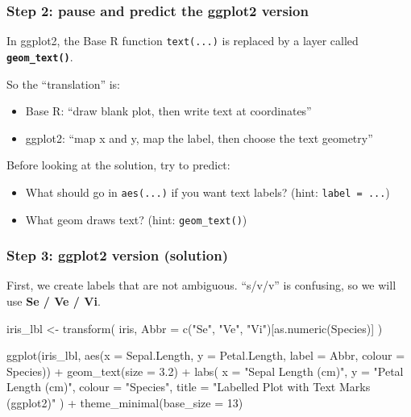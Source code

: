 \documentclass[
  letterpaper,
  DIV=11,
  numbers=noendperiod]{scrartcl}
\newenvironment{Shaded}{\begin{snugshade}}{\end{snugshade}}
\newcommand{\AttributeTok}[1]{\textcolor[rgb]{0.40,0.45,0.13}{#1}}
\newcommand{\DecValTok}[1]{\textcolor[rgb]{0.68,0.00,0.00}{#1}}
\newcommand{\FloatTok}[1]{\textcolor[rgb]{0.68,0.00,0.00}{#1}}
\newcommand{\FunctionTok}[1]{\textcolor[rgb]{0.28,0.35,0.67}{#1}}
\newcommand{\NormalTok}[1]{\textcolor[rgb]{0.00,0.23,0.31}{#1}}
\newcommand{\OtherTok}[1]{\textcolor[rgb]{0.00,0.23,0.31}{#1}}
\newcommand{\SpecialCharTok}[1]{\textcolor[rgb]{0.37,0.37,0.37}{#1}}
\newcommand{\StringTok}[1]{\textcolor[rgb]{0.13,0.47,0.30}{#1}}
\providecommand{\tightlist}{%
  \setlength{\itemsep}{0pt}\setlength{\parskip}{0pt}}\usepackage{longtable,booktabs,array}
\begin{document}
\subsubsection{Step 2: pause and predict the ggplot2
version}\label{step-2-pause-and-predict-the-ggplot2-version-2}

In ggplot2, the Base R function \texttt{text(...)} is replaced by a
layer called \textbf{\texttt{geom\_text()}}.

So the ``translation'' is:

\begin{itemize}
\tightlist
\item
  Base R: ``draw blank plot, then write text at coordinates''
\item
  ggplot2: ``map x and y, map the label, then choose the text geometry''
\end{itemize}

Before looking at the solution, try to predict:

\begin{itemize}
\tightlist
\item
  What should go in \texttt{aes(...)} if you want text labels? (hint:
  \texttt{label\ =\ ...})
\item
  What geom draws text? (hint: \texttt{geom\_text()})
\end{itemize}

\subsubsection{Step 3: ggplot2 version
(solution)}\label{step-3-ggplot2-version-solution-2}

First, we create labels that are not ambiguous. ``s/v/v'' is confusing,
so we will use \textbf{Se / Ve / Vi}.

\begin{Shaded}
\begin{Highlighting}[]
\NormalTok{iris\_lbl }\OtherTok{\textless{}{-}} \FunctionTok{transform}\NormalTok{(}
\NormalTok{  iris,}
  \AttributeTok{Abbr =} \FunctionTok{c}\NormalTok{(}\StringTok{"Se"}\NormalTok{, }\StringTok{"Ve"}\NormalTok{, }\StringTok{"Vi"}\NormalTok{)[}\FunctionTok{as.numeric}\NormalTok{(Species)]}
\NormalTok{)}

\FunctionTok{ggplot}\NormalTok{(iris\_lbl, }\FunctionTok{aes}\NormalTok{(}\AttributeTok{x =}\NormalTok{ Sepal.Length, }\AttributeTok{y =}\NormalTok{ Petal.Length, }\AttributeTok{label =}\NormalTok{ Abbr, }\AttributeTok{colour =}\NormalTok{ Species)) }\SpecialCharTok{+}
  \FunctionTok{geom\_text}\NormalTok{(}\AttributeTok{size =} \FloatTok{3.2}\NormalTok{) }\SpecialCharTok{+}
  \FunctionTok{labs}\NormalTok{(}
    \AttributeTok{x =} \StringTok{"Sepal Length (cm)"}\NormalTok{,}
    \AttributeTok{y =} \StringTok{"Petal Length (cm)"}\NormalTok{,}
    \AttributeTok{colour =} \StringTok{"Species"}\NormalTok{,}
    \AttributeTok{title =} \StringTok{"Labelled Plot with Text Marks (ggplot2)"}
\NormalTok{  ) }\SpecialCharTok{+}
  \FunctionTok{theme\_minimal}\NormalTok{(}\AttributeTok{base\_size =} \DecValTok{13}\NormalTok{)}
\end{Highlighting}
\end{Shaded}
\end{document}
